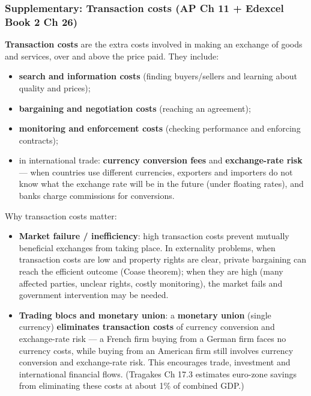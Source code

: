 \documentclass[a4paper,12pt]{article}
\newcommand{\needbold}[1]{\textcolor{red!70!black}{\textbf{#1}}}
\begin{document}
\subsubsection*{Supplementary: Transaction costs (AP Ch 11 + Edexcel Book 2 Ch 26)}
\needbold{Transaction costs} are the extra costs involved in making an exchange of goods and services, over and above the price paid. They include:
\begin{itemize}
  \item \textbf{search and information costs} (finding buyers/sellers and learning about quality and prices);
  \item \textbf{bargaining and negotiation costs} (reaching an agreement);
  \item \textbf{monitoring and enforcement costs} (checking performance and enforcing contracts);
  \item in international trade: \textbf{currency conversion fees} and \textbf{exchange-rate risk} --- when countries use different currencies, exporters and importers do not know what the exchange rate will be in the future (under floating rates), and banks charge commissions for conversions.
\end{itemize}
Why transaction costs matter:
\begin{itemize}
  \item \textbf{Market failure / inefficiency}: high transaction costs prevent mutually beneficial exchanges from taking place. In externality problems, when transaction costs are low and property rights are clear, private bargaining can reach the efficient outcome (Coase theorem); when they are high (many affected parties, unclear rights, costly monitoring), the market fails and government intervention may be needed.
  \item \textbf{Trading blocs and monetary union}: a \textbf{monetary union} (single currency) \textbf{eliminates transaction costs} of currency conversion and exchange-rate risk --- a French firm buying from a German firm faces no currency costs, while buying from an American firm still involves currency conversion and exchange-rate risk. This encourages trade, investment and international financial flows. (Tragakes Ch 17.3 estimates euro-zone savings from eliminating these costs at about 1\% of combined GDP.)
\end{itemize}
\end{document}
